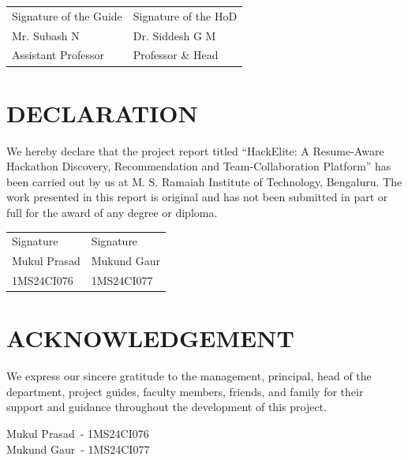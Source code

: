\documentclass[12pt,a4paper]{report}
\newcommand{\ProjectTitle}{HackElite: A Resume-Aware Hackathon Discovery, Recommendation and Team-Collaboration Platform}
\newcommand{\StudentOne}{Mukul Prasad}
\newcommand{\USNOne}{1MS24CI076}
\newcommand{\StudentTwo}{Mukund Gaur}
\newcommand{\USNTwo}{1MS24CI077}
\newcommand{\GuideOne}{Mr. Subash N}
\newcommand{\HOD}{Dr. Siddesh G M}
\begin{document}
\vspace{2.2cm}

\begin{tabularx}{\textwidth}{X X}
\centering Signature of the Guide & \centering\arraybackslash Signature of the HoD\\[0.3cm]
\centering \GuideOne & \centering\arraybackslash \HOD\\
\centering Assistant Professor & \centering\arraybackslash Professor \& Head\\
\end{tabularx}

\clearpage

\chapter*{DECLARATION}

We hereby declare that the project report titled ``\ProjectTitle'' has been carried out by us at M. S. Ramaiah Institute of Technology, Bengaluru. The work presented in this report is original and has not been submitted in part or full for the award of any degree or diploma.

\vspace{2.5cm}

\begin{tabularx}{\textwidth}{X X}
Signature & Signature\\[0.3cm]
\StudentOne & \StudentTwo\\
\USNOne & \USNTwo\\
\end{tabularx}

\clearpage

\chapter*{ACKNOWLEDGEMENT}

We express our sincere gratitude to the management, principal, head of the department, project guides, faculty members, friends, and family for their support and guidance throughout the development of this project.

\vspace{1cm}
\begin{flushright}
\StudentOne\ - \USNOne\\
\StudentTwo\ - \USNTwo
\end{flushright}
\end{document}

